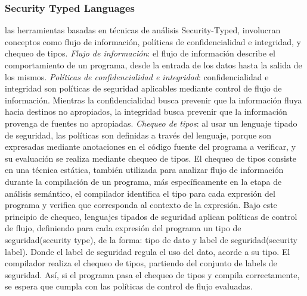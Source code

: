 \subsubsection{Security Typed Languages}
las herramientas basadas en técnicas de análisis Security-Typed, involucran
conceptos como flujo de información, políticas de confidencialidad e integridad,
y chequeo de tipos.\newline
\emph{Flujo de información}: el flujo de información describe el
comportamiento de un programa, desde la entrada de los datos hasta la salida de
los mismos.\newline 
\emph{Políticas de confidencialidad e integridad}: confidencialidad e integridad
son políticas de seguridad aplicables mediante control de flujo de información.
Mientras la confidencialidad busca prevenir que la información fluya hacia
destinos no apropiados, la integridad busca prevenir que la información provenga
de fuentes no apropiadas\cite{LanguageIFS-2013}.\newline
\emph{Chequeo de tipos}: al usar un lenguaje tipado de seguridad, las políticas
son definidas a través del lenguaje, porque son expresadas mediante anotaciones
en el código fuente del programa a verificar, y su evaluación se realiza
mediante chequeo de tipos.\newline 
El chequeo de tipos consiste en una técnica estática,
también utilizada para analizar flujo de información durante la compilación de
un programa, más específicamente en la etapa de análisis semántico, el
compilador identifica el tipo para cada expresión del programa y verifica que
corresponda al contexto de la expresión.
Bajo este principio de chequeo, lenguajes tipados de seguridad aplican
políticas de control de flujo, definiendo para cada expresión del programa un
tipo de seguridad(security type), de la forma:  tipo de dato y label de
seguridad(security label). Donde el label de seguridad regula el uso del dato,
acorde a su tipo.\newline 
El compilador realiza el chequeo de tipos, partiendo del conjunto de labels de
seguridad. Así, si el programa pasa el chequeo de tipos y compila correctamente,
se espera que cumpla con las políticas de control de flujo evaluadas.
